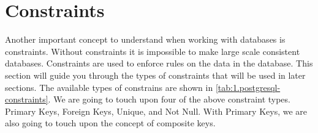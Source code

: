 \section{Constraints}
Another important concept to understand when working with databases is constraints. Without constraints it is impossible to make large scale consistent databases. Constraints are used to enforce rules on the data in the database. This section will guide you through the types of constraints that will be used in later sections. The available types of constrains are shown in \cref{tab:1.postgresql-constraints}. We are going to touch upon four of the above constraint types. Primary Keys, Foreign Keys, Unique, and Not Null. With Primary Keys, we are also going to touch upon the concept of composite keys.

\begin{table}[htb]
    \centering
    \caption{Commonly used constraints in PostgreSQL}
    \label{tab:1.postgresql-constraints}
\end{table}

